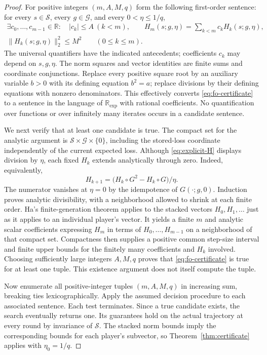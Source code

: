 \documentclass[11pt]{article}
\newcommand{\norm}[1]{\lVert #1\rVert}
\begin{document}
\begin{proof}
For positive integers $(m,A,M,q)$ form the following first-order sentence:
for every $s\in\mathcal S$, every $g\in\mathcal G$, and every
$0<\eta\leq1/q$,
\begin{equation}\label{eq:fo-certificate}
 \begin{gathered}
 \exists c_0,\ldots,c_{m-1}\in\mathbb R:
       \quad |c_k|\leq A\ (k<m),\qquad
       H_m(s;g,\eta)=\sum_{k<m}c_k H_k(s;g,\eta),\\
 \norm{H_k(s;g,\eta)}_2^2\leq M^2
                   \qquad(0\leq k\leq m).
 \end{gathered}
\end{equation}
The universal quantifiers have the indicated antecedents; coefficients
$c_k$ may depend on $s,g,\eta$. The norm squares and vector identities
are finite sums and coordinate conjunctions. Replace every positive
square root by an auxiliary variable $b>0$ with its defining equation
$b^2=a$; replace divisions by their defining equations with nonzero
denominators. This effectively converts \eqref{eq:fo-certificate} to a
sentence in the language of $\mathbb R_{\exp}$ with rational
coefficients. No quantification over functions or over infinitely many
iterates occurs in a candidate sentence.

We next verify that at least one candidate is true. The compact set for
the analytic argument is
$\mathcal S\times\mathcal G\times\{0\}$, including the stored-loss
coordinate independently of the current expected loss. Although
\eqref{eq:explicit-H} displays division by $\eta$, each fixed $H_k$
extends analytically through zero. Indeed, equivalently,
\[
 H_{k+1}=\bigl(H_k\circ G^2-H_k\circ G\bigr)/\eta.
\]
The numerator vanishes at $\eta=0$ by the idempotence of $G(\cdot;g,0)$.
Induction proves analytic divisibility, with a neighborhood allowed to
shrink at each finite order. Ha's finite-generation theorem applies to the
stacked vectors $H_0,H_1,\ldots$ just as it applies to an individual
player's vector. It yields a finite $m$ and analytic scalar coefficients
expressing $H_m$ in terms of $H_0,\ldots,H_{m-1}$ on a neighborhood of
that compact set. Compactness then supplies a positive common step-size
interval and finite upper bounds for the finitely many coefficients and
$H_k$ involved. Choosing sufficiently large integers $A,M,q$ proves
that \eqref{eq:fo-certificate} is true for at least one tuple. This
existence argument does not itself compute the tuple.

Now enumerate all positive-integer tuples $(m,A,M,q)$ in increasing sum,
breaking ties lexicographically. Apply the assumed decision procedure to
each associated sentence. Each test terminates. Since a true candidate
exists, the search eventually returns one. Its guarantees hold on the
actual trajectory at every round by invariance of $\mathcal S$.
The stacked norm bounds imply the corresponding bounds for each player's
subvector, so Theorem~\ref{thm:certificate} applies with
$\eta_0=1/q$.


\end{proof}
\end{document}
